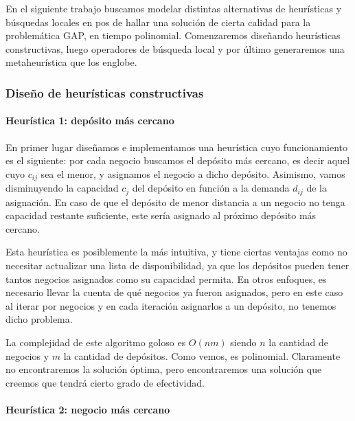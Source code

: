 \documentclass[
]{article}
\begin{document}
En el siguiente trabajo buscamos modelar distintas alternativas de
heurísticas y búsquedas locales en pos de hallar una solución de cierta
calidad para la problemática GAP, en tiempo polinomial. Comenzaremos
diseñando heurísticas constructivas, luego operadores de búsqueda local
y por último generaremos una metaheurística que los englobe.

\hypertarget{diseuxf1o-de-heuruxedsticas-constructivas}{%
\subsubsection{Diseño de heurísticas
constructivas}\label{diseuxf1o-de-heuruxedsticas-constructivas}}

\hypertarget{heuruxedstica-1-depuxf3sito-muxe1s-cercano}{%
\paragraph{Heurística 1: depósito más
cercano}\label{heuruxedstica-1-depuxf3sito-muxe1s-cercano}}

En primer lugar diseñamos e implementamos una heurística cuyo
funcionamiento es el siguiente: por cada negocio buscamos el depósito
más cercano, es decir aquel cuyo \(c_{ij}\) sea el menor, y asignamos el
negocio a dicho depósito. Asimismo, vamos disminuyendo la capacidad
\(c_j\) del depósito en función a la demanda \(d_{ij}\) de la
asignación. En caso de que el depósito de menor distancia a un negocio
no tenga capacidad restante suficiente, este sería asignado al próximo
depósito más cercano.

Esta heurística es posiblemente la más intuitiva, y tiene ciertas
ventajas como no necesitar actualizar una lista de disponibilidad, ya
que los depósitos pueden tener tantos negocios asignados como su
capacidad permita. En otros enfoques, es necesario llevar la cuenta de
qué negocios ya fueron asignados, pero en este caso al iterar por
negocios y en cada iteración asignarlos a un depósito, no tenemos dicho
problema.

La complejidad de este algoritmo goloso es \(O(n m)\) siendo \(n\) la
cantidad de negocios y \(m\) la cantidad de depósitos. Como vemos, es
polinomial. Claramente no encontraremos la solución óptima, pero
encontraremos una solución que creemos que tendrá cierto grado de
efectividad.

\hypertarget{heuruxedstica-2-negocio-muxe1s-cercano}{%
\paragraph{Heurística 2: negocio más
cercano}\label{heuruxedstica-2-negocio-muxe1s-cercano}}
\end{document}
